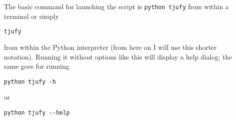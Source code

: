The basic command for launching the script is \texttt{python tjufy} from within
a terminal or simply \begin{center}\texttt{tjufy}\end{center} from within the
Python interpreter (from here on I will use this shorter notation). Running it
without options like this will display a help dialog; the same goes for running
\begin{center}\texttt{python tjufy -h}\end{center} or
\begin{center}\texttt{python tjufy -{}-help}\end{center}



